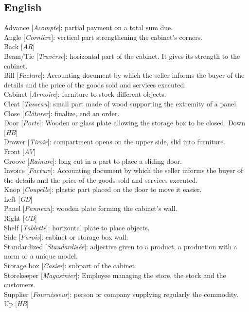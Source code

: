     \subsection{English}
        Advance [\textit{Acompte}]: partial payment on a total sum due.  \\
        Angle [\textit{Cornière}]: vertical part strengthening the cabinet’s corners. \\
        Back [\textit{AR}] \\
        Beam/Tie [\textit{Travèrse}]: horizontal part of the cabinet. It gives its strength to the cabinet. \\
        Bill [\textit{Facture}]: Accounting document by which the seller informs the buyer of the details and the price of the goods sold and services executed. \\
        Cabinet [\textit{Armoire}]: furniture to stock different objects. \\
        Cleat [\textit{Tasseau}]: small part made of wood supporting the extremity of a panel. \\
        Close [\textit{Clôturer}]: finalize, end an order.  \\
        Door [\textit{Porte}]: Wooden or glass plate allowing the storage box to be closed. 
        Down [\textit{HB}] \\
        Drawer [\textit{Tiroir}]: compartment opens on the upper side, slid into furniture. \\ 
        Front [\textit{AV}] \\
        Groove [\textit{Rainure}]: long cut in a part to place a sliding door. \\
        Invoice [\textit{Facture}]: Accounting document by which the seller informs the buyer of the details and the price of the goods sold and services executed. \\
        Knop [\textit{Coupelle}]: plastic part placed on the door to move it easier. \\
        Left [\textit{GD}] \\
        Panel [\textit{Panneau}]: wooden plate forming the cabinet’s wall. \\
        Right [\textit{GD}] \\
        Shelf [\textit{Tablette}]: horizontal plate to place objects. \\
        Side [\textit{Parois}]: cabinet or storage box wall. \\
        Standardized [\textit{Standardisée}]: adjective given to a product, a production with a norm or a unique model. \\
        Storage box [\textit{Casier}]: subpart of the cabinet. \\
        Storekeeper [\textit{Magasinier}]: Employee managing the store, the stock and the customers. \\
        Supplier [\textit{Fournisseur}]: person or company supplying regularly the commodity.\\ 
        Up [\textit{HB}]



